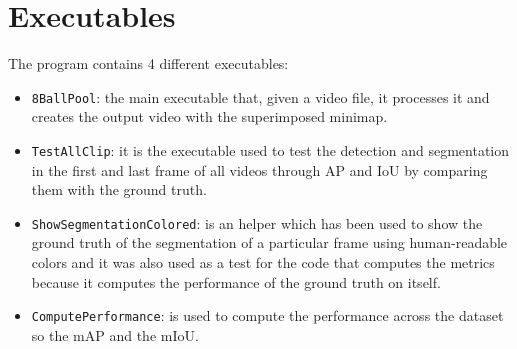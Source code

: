 \section{Executables}
The program contains 4 different executables:
\begin{itemize}
	\item \texttt{8BallPool}: the main executable that, given a video file, it processes it and creates the output video with the superimposed minimap.
	\item \texttt{TestAllClip}: it is the executable used to test the detection and segmentation in the first and last frame of all videos through AP and IoU by comparing them with the ground truth.
	\item \texttt{ShowSegmentationColored}: is an helper which has been used to show the ground truth of the segmentation of a particular frame using human-readable colors and it was also used as a test for the code that computes the metrics because it computes the performance of the ground truth on itself.
	\item \texttt{ComputePerformance}: is used to compute the performance across the dataset so the mAP and the mIoU.
\end{itemize}


